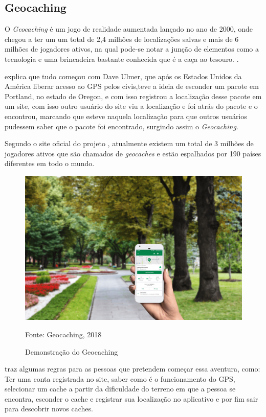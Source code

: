 	\subsection{Geocaching}
	O \textit{Geocaching} é um jogo de realidade aumentada lançado no ano de 2000, onde chegou a ter um um total de 2,4 milhões de localizações salvas e mais de 6 milhões de jogadores ativos, na qual pode-se notar a junção de elementos como a tecnologia e uma brincadeira bastante conhecida que é a caça ao tesouro. \cite{2014geocaching}.
	
	 explica que tudo começou com Dave Ulmer, que após os Estados Unidos da América liberar acesso ao GPS pelos civis,teve a ideia de esconder um pacote em Portland, no estado de Oregon, e com isso registrou a localização desse pacote em um site, com isso outro usuário do site viu a localização e foi atrás do pacote e o encontrou, marcando que esteve naquela localização para que outros usuários pudessem saber que o pacote foi encontrado, surgindo assim o \textit{Geocaching}.
	
	Segundo o site oficial do projeto , atualmente existem um total de 3 milhões de jogadores ativos que são chamados de \textit{geocaches} e estão espalhados por 190 países diferentes em todo o mundo.
	
	
	\begin{figure}[H]
		\centering
		\includegraphics[scale=0.3]{imagens/geocaching}
		\caption{Demonstração do Geocaching}
		Fonte: Geocaching, 2018
		\label{fig:geocahing}
	\end{figure}
	
	 traz algumas regras para as pessoas que pretendem começar essa aventura, como: Ter uma conta registrada no site, saber como é o funcionamento do GPS, selecionar um cache a partir da dificuldade do terreno em que a pessoa se encontra, esconder o cache e registrar sua localização no aplicativo e por fim sair para descobrir novos caches.
	
